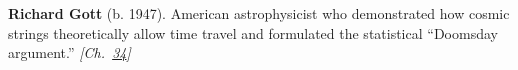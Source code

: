 \textbf{Richard Gott} (b. 1947). American astrophysicist who demonstrated how cosmic strings theoretically allow time travel and formulated the statistical ``Doomsday argument.'' \emph{[Ch.~\hyperref[ch:boltzmannbrain]{34}]}

